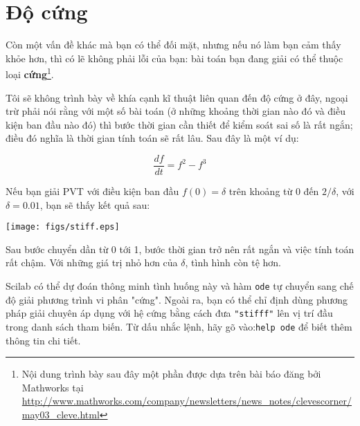 \documentclass[12pt]{book}
\begin{document}
%
%
%


\section{Độ cứng}

Còn một vấn đề khác mà bạn có thể đối mặt, nhưng nếu nó làm bạn
cảm thấy khỏe hơn, thì có lẽ không phải lỗi của bạn: bài toán bạn
đang giải có thể thuộc loại {\bf cứng}\footnote{Nội dung trình bày
sau đây một phần được dựa trên bài báo đăng bởi Mathworks tại
\url{http://www.mathworks.com/company/newsletters/news_notes/clevescorner/may03_cleve.html}}.

Tôi sẽ không trình bày về khía cạnh kĩ thuật liên quan đến độ cứng 
ở đây, ngoại trừ phải nói rằng với một số bài toán (ở những khoảng
thời gian nào đó và điều kiện ban đầu nào đó) thì bước thời gian cần thiết
để kiểm soát sai số là rất ngắn; điều đó nghĩa là thời gian tính toán
sẽ rất lâu. Sau đây là một ví dụ:

\[ \frac{df}{dt} = f^2 - f^3 \]

Nếu bạn giải PVT với điều kiện ban đầu  $f(0) = \delta$ trên khoảng
từ 0 đến $2/\delta$, với $\delta = 0.01$, bạn sẽ thấy kết quả sau:

\centerline{\texttt{[image: figs/stiff.eps]}}

Sau bước chuyển dần từ 0 tới 1, bước thời gian trở nên rất ngắn
và việc tính toán rất chậm. Với những giá trị nhỏ hơn của $\delta$, 
tình hình còn tệ hơn.

Scilab có thể dự đoán thông minh tình huống này và hàm \texttt{ode} tự chuyển sang
chế độ giải phương trình vi phân "cứng". Ngoài ra, bạn có thể chỉ định
dùng phương pháp giải chuyên áp dụng với hệ cứng bằng cách
đưa \texttt{"stifff"} lên vị trí đầu trong danh sách tham biến.
Từ dấu nhắc lệnh, hãy gõ vào:\texttt{help ode} để biết thêm 
thông tin chi tiết.
\end{document}
